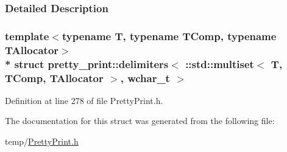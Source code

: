 \subsubsection{Detailed Description}
\subsubsection*{template$<$typename T, typename T\+Comp, typename T\+Allocator$>$\\*
struct pretty\+\_\+print\+::delimiters$<$ \+::std\+::multiset$<$ T, T\+Comp, T\+Allocator $>$, wchar\+\_\+t $>$}



Definition at line 278 of file Pretty\+Print.\+h.



The documentation for this struct was generated from the following file\+:\begin{DoxyCompactItemize}
\item 
temp/\hyperlink{PrettyPrint_8h}{Pretty\+Print.\+h}\end{DoxyCompactItemize}
